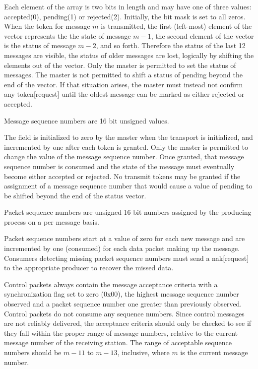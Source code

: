 \documentclass[11pt]{article}
\begin{document}
   Each element of the array is two bits in length and may have one of
   three values: accepted(0), pending(1) or rejected(2). Initially, the
   bit mask is set to all zeros. When the token for message $m$ is
   transmitted, the first (left-most) element of the vector represents
   the the state of message $m - 1$, the second element of the vector is
   the status of message $m - 2$, and so forth. Therefore the status of
   the last 12 messages are visible, the status of older messages are
   lost, logically by shifting the elements out of the vector. Only the
   master is permitted to set the status of messages. The master is not
   permitted to shift a status of pending beyond the end of the vector.
   If that situation arises, the master must instead not confirm any
   token[request] until the oldest message can be marked as either
   rejected or accepted.

   \hypertarget{msg-seq}{Message sequence numbers are 16 bit unsigned
   values.} The field is initialized to zero by the master when the
   transport is initialized, and incremented by one after each token is
   granted. Only the master is permitted to change the value of the message
   sequence number. Once granted, that message sequence number is consumed
   and the state of the message must eventually become either accepted or
   rejected. No transmit tokens may be granted if the assignment of a
   message sequence number that would cause a value of pending to be
   shifted beyond the end of the status vector.

   \hypertarget{packet-seq}{Packet sequence numbers are unsigned 16 bit
   numbers assigned by the producing process on a per message basis.}
   Packet sequence numbers start at a value of zero for each new message
   and are incremented by one (consumed) for each data packet making up the
   message. Consumers detecting missing packet sequence numbers must send a
   nak[request] to the appropriate producer to recover the missed data.

   Control packets always contain the message acceptance criteria with a
   synchronization flag set to zero (0x00), the highest message sequence
   number observed and a packet sequence number one greater than
   previously observed. Control packets do not consume any sequence
   numbers.  Since control messages are not reliably delivered, the
   acceptance criteria should only be checked to see if they fall within
   the proper range of message numbers, relative to the current message
   number of the receiving station.  The range of acceptable sequence
   numbers should be $m-11$ to $m-13$, inclusive, where $m$ is the current
   message number.
\end{document}
